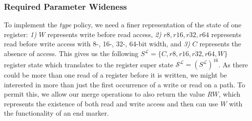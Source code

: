 
\subsubsection{Required Parameter Wideness}
\label{subsection:requiredparamwideness}
To implement the \emph{type} policy, we need a finer representation of the state of one register:
\textit{1)} $W$ represents write before read access,
\textit{2)} $r8, r16, r32, r64$ represents read before write access with 8-, 16-, 32-, 64-bit width, and
\textit{3)} $C$ represents the absence of access.
This gives us the following $S^\mathcal{L} = \{ C, r8, r16, r32, r64, W \}$ register state which translates to the register super state 
$\mathcal{S}^\mathcal{L} = (S^\mathcal{L})^{16}$.
As there could be more than one read of a register before it is written, we might be interested in more than just the first occurrence of a write or read on a path. 
To permit this, we allow our merge operations to also return the value $RW$, which represents the existence of both read and write access and then can use $W$ with the functionality of an end marker.
